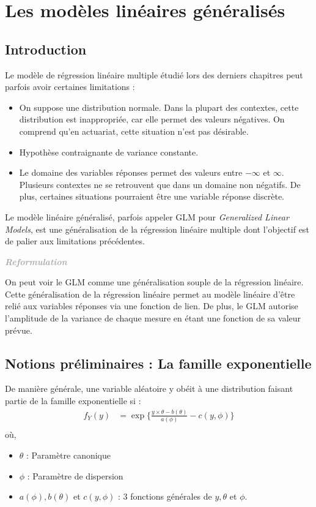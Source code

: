 \documentclass[11pt,french]{report}
\newenvironment{moreInfo}[1]
	{\begin{mdframed}
	\textcolor{darkgray}{\huge \raisebox{-3.5pt}{\faInfo} 
	\hspace{0.5cm} \large\bfseries #1}\\[5pt]
	\normalsize
	\makebox[0.1\textwidth][l]{}	
	\begin{minipage}{10cm}}
	{	\end{minipage}
	\end{mdframed}}
\begin{document}
\chapter{Les modèles linéaires généralisés}
\section{Introduction}
Le modèle de régression linéaire multiple étudié lors des derniers chapitres peut parfois avoir certaines limitations : 
\begin{itemize}
\item On suppose une distribution normale. Dans la plupart des contextes, cette distribution est inappropriée, car elle permet des valeurs négatives. On comprend qu'en actuariat, cette situation n'est pas désirable.
\item Hypothèse contraignante de variance constante.
\item Le domaine des variables réponses permet des valeurs entre $-\infty$ et $\infty$. Plusieurs contextes ne se retrouvent que dans un domaine non négatifs. De plus, certaines situations pourraient être une variable réponse discrète.
\end{itemize}

Le modèle linéaire généralisé, parfois appeler GLM pour \emph{Generalized Linear Models}, est une généralisation de la régression linéaire multiple dont l'objectif est de palier aux limitations précédentes.

\begin{moreInfo}{\emph{Reformulation}}
     On peut voir le GLM comme une généralisation souple de la régression linéaire. Cette généralisation de la régression linéaire permet au modèle linéaire d'être relié aux variables réponses via une fonction de lien. De plus, le GLM autorise l'amplitude de la variance de chaque mesure en étant une fonction de sa valeur prévue.
\end{moreInfo}

\section{Notions préliminaires : La famille exponentielle}
De manière générale, une variable aléatoire y obéit à une distribution faisant partie de la famille exponentielle si :
\begin{align*}
f_Y(y) &= \exp\bigg\lbrace \frac{y \times \theta - b(\theta)}{a(\phi)} - c(y, \phi) \bigg\rbrace \\
\end{align*}
où,
\begin{itemize}
     \item $\theta$ : Paramètre canonique
     \item $\phi $ : Paramètre de dispersion
     \item $a(\phi), b(\theta)$ et $c(y, \phi)$ : 3 fonctions générales de $y, \theta$ et $\phi$.
\end{itemize}
\end{document}

